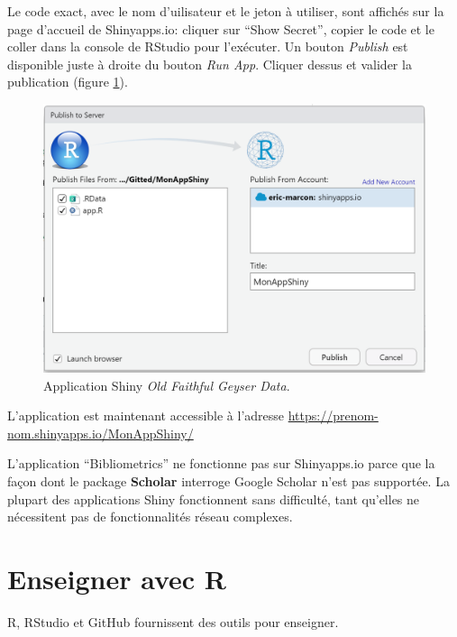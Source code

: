 \documentclass[
  11pt,
  french,
  a4paper,
  extrafontsizes,onecolumn,openright
  ]{memoir}
\begin{document}
\normalsize

Le code exact, avec le nom d'uilisateur et le jeton à utiliser, sont affichés sur la page d'accueil de Shinyapps.io: cliquer sur ``Show Secret'', copier le code et le coller dans la console de RStudio pour l'exécuter.
Un bouton \emph{Publish} est disponible juste à droite du bouton \emph{Run App}.
Cliquer dessus et valider la publication (figure \ref{fig:shiny-publish}).



\scriptsize

\begin{figure}

{\centering \includegraphics[width=0.8\linewidth]{images/shiny-publish} 

}

\caption{Application Shiny \emph{Old Faithful Geyser Data}.}\label{fig:shiny-publish}
\end{figure}

\normalsize

L'application est maintenant accessible à l'adresse \url{https://prenom-nom.shinyapps.io/MonAppShiny/}

L'application ``Bibliometrics'' ne fonctionne pas sur Shinyapps.io parce que la façon dont le package \textbf{Scholar} interroge Google Scholar n'est pas supportée.
La plupart des applications Shiny fonctionnent sans difficulté, tant qu'elles ne nécessitent pas de fonctionnalités réseau complexes.

\hypertarget{chap:enseigner}{%
\chapter{Enseigner avec R}\label{chap:enseigner}}

R, RStudio et GitHub fournissent des outils pour enseigner.
\end{document}
